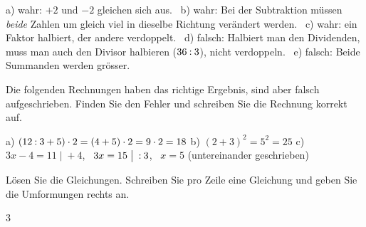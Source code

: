 \documentclass[11pt]{exam}
\begin{document}
\begin{questions}
\begin{solution}
  a) wahr: $+2$ und $-2$ gleichen sich aus. \
  b) wahr: Bei der Subtraktion müssen \emph{beide} Zahlen um gleich viel in dieselbe Richtung
  verändert werden. \
  c) wahr: ein Faktor halbiert, der andere verdoppelt. \
  d) falsch: Halbiert man den Dividenden, muss man auch den Divisor
  halbieren ($36 \mathbin{:} 3$), nicht verdoppeln. \
  e) falsch: Beide Summanden werden grösser.
\end{solution}
\raum{3cm}

\question Die folgenden Rechnungen haben das richtige Ergebnis, sind aber
falsch aufgeschrieben. Finden Sie den Fehler und schreiben Sie die Rechnung
korrekt auf.
\begin{solution}
  a) $(12 \mathbin{:} 3 + 5) \cdot 2 = (4 + 5) \cdot 2 = 9 \cdot 2 = 18$ \quad
  b) $(2 + 3)^2 = 5^2 = 25$ \quad
  c) $3x - 4 = 11 \;\big|\; +4$, \ $3x = 15 \;\big|\; \mathbin{:} 3$, \ $x = 5$
  (untereinander geschrieben)
\end{solution}
\raum{5cm}

\question Lösen Sie die Gleichungen. Schreiben Sie pro Zeile eine Gleichung
und geben Sie die Umformungen rechts an.
\begin{multicols}{3}
\end{multicols}
\end{questions}
\end{document}
